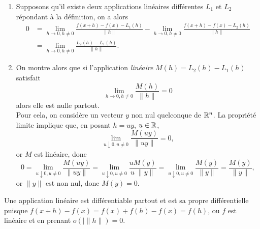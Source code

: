 \proof
\begin{enumerate}
  \item Supposons qu'il existe deux applications linéaires différentes $L_1$ et $L_2$ répondant à la définition, on a alors
  \begin{align*}
    0 & = \lim_{h\to 0, h \neq 0} \frac{f(x+h) - f(x) - L_1(h)}{\|h\|}
    - \lim_{h\to 0, h \neq 0} \frac{f(x+h) - f(x) - L_2(h)}{\|h\|} \\
    & = \lim_{h\to 0, h \neq 0} \frac{L_2(h) - L_1(h)}{\|h\|}. 
  \end{align*}
  \item On montre alors que si l'application {\em linéaire} $M(h) = L_2(h) - L_1(h)$ satisfait
  $$
  \lim_{h \to 0, h \neq 0} \frac{M(h)}{\|h\|} 
  = 0
  $$
  alors elle est nulle partout. \\
  Pour cela, on considère un vecteur $y$ non nul quelconque de $\mathbb{R}^n$. La propriété limite implique que, en posant $h = uy$, $u \in \mathbb{R}$, 
  $$
  \lim_{u \downarrow 0, u \neq 0} \frac{M(u y)}{\|u y\|} = 0,
  $$  
  or $M$ est linéaire, donc 
  $$
  0
  = \lim_{u \downarrow 0, u \neq 0} \frac{M(u y)}{\|u y\|} 
  = \lim_{u \downarrow 0, u \neq 0} \frac{u M(y)}{u \; \|y\|} 
  = \lim_{u \downarrow 0, u \neq 0} \frac{M(y)}{\|y\|} 
  = \frac{M(y)}{\|y\|},
  $$  
  or $\|y\|$ est non nul, donc $M(y) = 0$.
\end{enumerate}
\eproof

\remark
Une application linéaire est différentiable partout et est sa propre différentielle puisque $f(x+h) - f(x) = f(x) + f(h) - f(x) = f(h)$, ou $f$ est linéaire et en prenant $o(|\|h\|) = 0$.

% 

